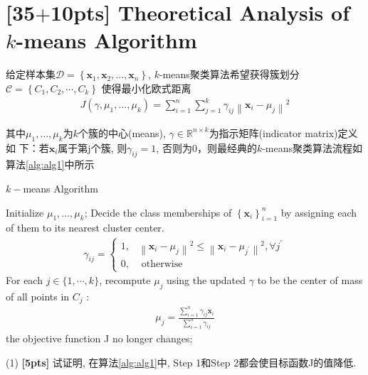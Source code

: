 \documentclass[a4paper,UTF8]{article}
\theoremstyle{definition}
\begin{document}
\section{\textbf{[35$+$10pts]} Theoretical Analysis of $k$-means Algorithm}
给定样本集$\mathcal{D}=\left\{\mathbf{x}_{1}, \mathbf{x}_{2}, \ldots, \mathbf{x}_{n}\right\}$, $k$-means聚类算法希望获得簇划分$\mathcal{C}=\left\{C_{1}, C_{2}, \cdots, C_{k}\right\}$
使得最小化欧式距离
\begin{align} \label{eq1}
J\left(\gamma, \mu_{1}, \ldots, \mu_{k}\right)=\sum_{i=1}^{n} \sum_{j=1}^{k} \gamma_{i j}\left\|\mathbf{x}_{i}-\mu_{j}\right\|^{2}
\end{align}

其中$\mu_{1}, \ldots, \mu_{k}$为$k$个簇的中心(means), 
 $\gamma \in \mathbb{R}^{n \times k}$为指示矩阵(indicator matrix)定义如
下：若$\mathbf{x}_{i}$属于第j个簇, 则$\gamma_{i j}=1$, 否则为0，则最经典的$k$-means聚类算法流程如算法\ref{alg:alg1}中所示

{\begin{algorithm}[h]
		\caption{ $k-$means Algorithm }
		\label{alg:alg1}
		\begin{algorithmic}[1]{
				\STATE Initialize $\mu_{1}, \ldots, \mu_{k}$;
				\REPEAT
				 Decide the class memberships of $\left\{\mathbf{x}_{i}\right\}_{i=1}^{n}$ by assigning each of them to its nearest cluster center.
				\begin{align}\nonumber\gamma_{i j}=\left\{\begin{array}{ll}
				1, & \left\|\mathbf{x}_{i}-\mu_{j}\right\|^{2} \leq\left\|\mathbf{x}_{i}-\mu_{j^{\prime}}\right\|^{2}, \forall j^{\prime} \\
				0, & \text { otherwise }
				\end{array}\right.\end{align}
				 For each $j \in\{1, \cdots, k\}$, recompute $\mu_j$ using the updated $\gamma$ to be	the center of mass of all points in $C_j$ :
			\begin{align}\nonumber\mu_{j}=\frac{\sum_{i=1}^{n} \gamma_{i j} \mathbf{x}_{i}}{\sum_{i=1}^{n} \gamma_{i j}}
			\end{align}	
				\UNTIL the objective function J no longer changes;}
		\end{algorithmic}
		
\end{algorithm}}


(1) \textbf{[5pts]} 试证明, 在算法\ref{alg:alg1}中, Step 1和Step 2都会使目标函数J的值降低.
\end{document}
